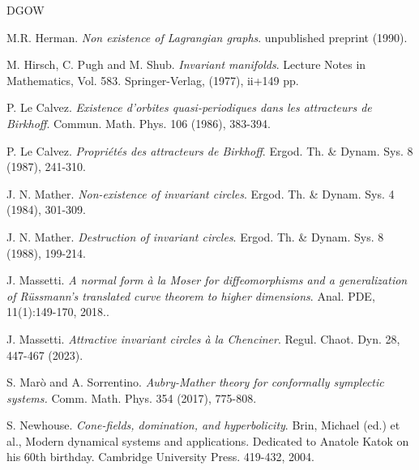 \documentclass{amsart}
\theoremstyle{definition}
\begin{document}
\begin{thebibliography}{DGOW}

 M.R. Herman. {\it Non existence of Lagrangian graphs}.
unpublished preprint (1990).


 M. Hirsch, C. Pugh and M. Shub. {\it Invariant manifolds}. Lecture Notes in Mathematics, Vol. 583. Springer-Verlag, (1977), ii+149 pp.


 P.  Le Calvez. {\it Existence d'orbites quasi-periodiques dans les attracteurs de Birkhoff}.
Commun. Math. Phys. {106} (1986), 383-394.

 P.  Le Calvez. {\it Propri\'{e}t\'{e}s des attracteurs de Birkhoff}.
Ergod. Th. \& Dynam. Sys. {8} (1987), 241-310.




%
  J. N. Mather. {\it Non-existence of invariant circles}. Ergod.
 Th. \& Dynam. Sys. {4} (1984), 301-309.



  J. N. Mather. {\it Destruction of invariant circles}. Ergod.
 Th. \& Dynam. Sys. {8} (1988), 199-214.



 {J. Massetti. {\it A normal form \`{a} la Moser for diffeomorphisms and a generalization of R\"{u}ssmann's translated curve theorem
 to higher dimensions}. Anal. PDE, 11(1):149-170, 2018..}


 {J. Massetti. {\it Attractive invariant circles \`{a} la Chenciner}. Regul. Chaot. Dyn. 28, 447-467 (2023).}

 S. Mar\`o and A. Sorrentino.
{\it Aubry-Mather theory for conformally symplectic systems.} Comm. Math. Phys.  {354} (2017), 775-808.


 S. Newhouse. {\it Cone-fields, domination, and hyperbolicity}. Brin,
 Michael (ed.) et al., Modern dynamical systems and applications.
 Dedicated to Anatole Katok on his 60th birthday. Cambridge University Press. 419-432, 2004.





\end{thebibliography}
\end{document}
